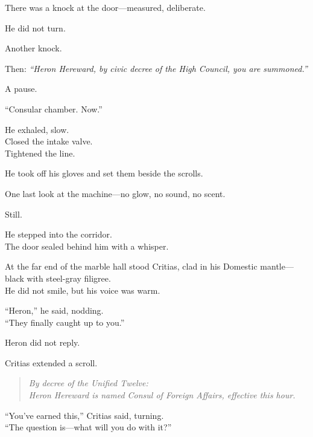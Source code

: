 \documentclass[9pt]{article}
\begin{document}
\vspace{1em}

There was a knock at the door—measured, deliberate.

He did not turn.

Another knock.

Then: \textit{“Heron Hereward, by civic decree of the High Council, you are summoned.”}

A pause.

“Consular chamber. Now.”

\vspace{1em}

He exhaled, slow.\\
Closed the intake valve.\\
Tightened the line.

He took off his gloves and set them beside the scrolls.

One last look at the machine—no glow, no sound, no scent.

Still.

\vspace{1em}

He stepped into the corridor.\\
The door sealed behind him with a whisper.

\vspace{1em}

\noindent At the far end of the marble hall stood Critias, clad in his Domestic mantle—black with steel-gray filigree.\\
He did not smile, but his voice was warm.

\vspace{1em}

“Heron,” he said, nodding.\\
“They finally caught up to you.”

Heron did not reply.

\vspace{1em}

Critias extended a scroll.

\begin{quote}
\textit{By decree of the Unified Twelve:\\
Heron Hereward is named Consul of Foreign Affairs, effective this hour.}
\end{quote}

\vspace{1em}

“You’ve earned this,” Critias said, turning.\\
“The question is—what will you do with it?”
\end{document}
